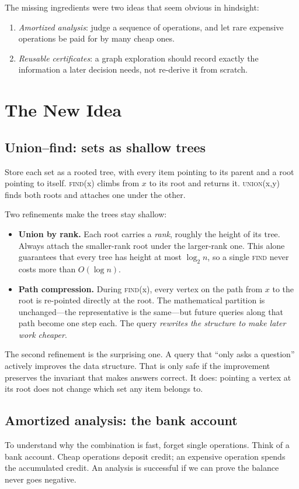 The missing ingredients were two ideas that seem obvious in hindsight:
\begin{enumerate}
\item \emph{Amortized analysis}: judge a sequence of operations, and let rare expensive operations be paid for by many cheap ones.
\item \emph{Reusable certificates}: a graph exploration should record exactly the information a later decision needs, not re-derive it from scratch.
\end{enumerate}

\section{The New Idea}
\subsection{Union--find: sets as shallow trees}
Store each set as a rooted tree, with every item pointing to its parent and a root pointing to itself. \textsc{find}(x) climbs from $x$ to its root and returns it. \textsc{union}(x,y) finds both roots and attaches one under the other.

Two refinements make the trees stay shallow:
\begin{itemize}
\item \textbf{Union by rank.} Each root carries a \emph{rank}, roughly the height of its tree. Always attach the smaller-rank root under the larger-rank one. This alone guarantees that every tree has height at most $\log_2 n$, so a single \textsc{find} never costs more than $O(\log n)$.
\item \textbf{Path compression.} During \textsc{find}(x), every vertex on the path from $x$ to the root is re-pointed directly at the root. The mathematical partition is unchanged---the representative is the same---but future queries along that path become one step each. The query \emph{rewrites the structure to make later work cheaper}.
\end{itemize}

The second refinement is the surprising one. A query that ``only asks a question'' actively improves the data structure. That is only safe if the improvement preserves the invariant that makes answers correct. It does: pointing a vertex at its root does not change which set any item belongs to.

\subsection{Amortized analysis: the bank account}
To understand why the combination is fast, forget single operations. Think of a bank account. Cheap operations deposit credit; an expensive operation spends the accumulated credit. An analysis is successful if we can prove the balance never goes negative.

